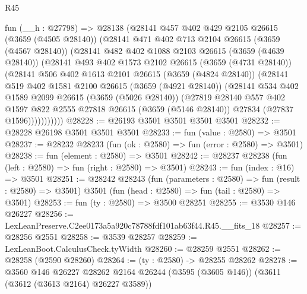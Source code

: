 \begin{lexlean}{R45}
\begin{coremodule}
      fun (__h : @27798) =>
      @28138
        (@28141
          @457
          @402
          @429
          @2105
          @26615
          (@3659 (@4505 @28140))
          (@28141
            @471
            @402
            @713
            @2104
            @26615
            (@3659 (@4567 @28140))
            (@28141
              @482
              @402
              @1088
              @2103
              @26615
              (@3659 (@4639 @28140))
              (@28141
                @493
                @402
                @1573
                @2102
                @26615
                (@3659 (@4731 @28140))
                (@28141
                  @506
                  @402
                  @1613
                  @2101
                  @26615
                  (@3659 (@4824 @28140))
                  (@28141
                    @519
                    @402
                    @1581
                    @2100
                    @26615
                    (@3659 (@4921 @28140))
                    (@28141
                      @534
                      @402
                      @1589
                      @2099
                      @26615
                      (@3659 (@5026 @28140))
                      (@27819
                        @28140
                        @557
                        @402
                        @1597
                        @822
                        @2555
                        @27818
                        @26615
                        (@3659 (@5146 @28140))
                        @27834
                        (@27837 @1596)))))))))))
@28228 := @26193 @3501 @3501 @3501 @3501
@28232 := @28228 @26198 @3501 @3501 @3501
@28233 := fun (value : @2580) => @3501
@28237 := @28232 @28233 (fun (ok : @2580) => fun (error : @2580) => @3501)
@28238 := fun (element : @2580) => @3501
@28242 := @28237 @28238 (fun (left : @2580) => fun (right : @2580) => @3501)
@28243 := fun (index : @16) => @3501
@28251 := @28242
    @28243
    (fun (parameters : @2580) => fun (result : @2580) => @3501)
    @3501
    (fun (head : @2580) => fun (tail : @2580) => @3501)
@28253 := fun (ty : @2580) => @3500 @28251
@28255 := @3530 @146 @26227
@28256 := LexLeanPreserve.C2ee0173a5a920c78788fdf101ab63f44.R45.__fits_18
@28257 := @28256 @2551
@28258 := @3539 @28257
@28259 := LexLeanBoot.CalculusCheck.tyWidth
@28260 := @28259 @2551
@28262 := @28258 (@2590 @28260)
@28264 := (ty : @2580) -> @28255 @28262
@28278 := @3560
    @146
    @26227
    @28262
    @2164
    @26244
    (@3595 (@3605 @146))
    (@3611 (@3612 (@3613 @2164) @26227 @3589))

\end{coremodule}
\end{lexlean}
